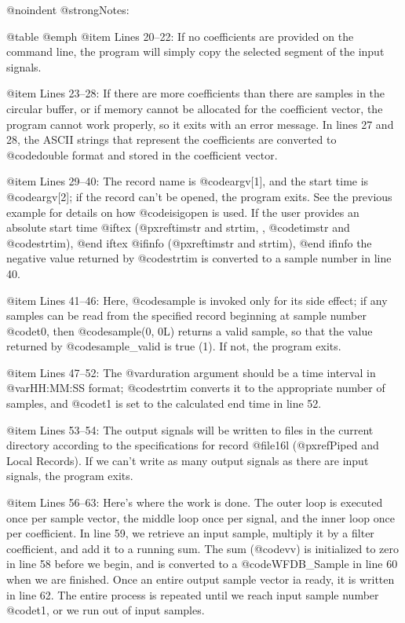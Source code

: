 {{{{{{{{{{@noindent
@strong{Notes:}

@table @emph
@item Lines 20--22:
If no coefficients are provided on the command line, the program will
simply copy the selected segment of the input signals.

@item Lines 23--28:
If there are more coefficients than there are samples in the circular
buffer, or if memory cannot be allocated for the coefficient vector, the
program cannot work properly, so it exits with an error message.  In
lines 27 and 28, the ASCII strings that represent the coefficients are
converted to @code{double} format and stored in the coefficient
vector.

@item Lines 29--40:
The record name is @code{argv[1]}, and the start time is @code{argv[2]};
if the record can't be opened, the program exits.  See the previous example
for details on how @code{isigopen} is used. If the user provides an absolute
start time
@iftex
(@pxref{timstr and strtim, , @code{timstr} and @code{strtim}}),
@end iftex
@ifinfo
(@pxref{timstr and strtim}),
@end ifinfo
the negative value returned by @code{strtim} is converted to a sample number
in line 40.

@item Lines 41--46:
Here, @code{sample} is invoked only for its side effect;  if any samples can
be read from the specified record beginning at sample number @code{t0}, then
@code{sample(0, 0L)} returns a valid sample, so that the value returned by
@code{sample_valid} is true (1).  If not, the program exits.

@item Lines 47--52:
The @var{duration} argument should be a time interval in @var{HH:MM:SS}
format; @code{strtim} converts it to the appropriate number of
samples, and @code{t1} is set to the calculated end time in line 52.

@item Lines 53--54:
The output signals will be written to files in the current directory
according to the specifications for record @file{16l}
(@pxref{Piped and Local Records}).  If we can't write as many output
signals as there are input signals, the program exits.

@item Lines 56--63:
Here's where the work is done.  The outer loop is executed once per
sample vector, the middle loop once per signal, and the inner loop
once per coefficient.  In line 59, we retrieve an input sample,
multiply it by a filter coefficient, and add it to a running sum.
The sum (@code{vv}) is initialized to zero in line 58 before we begin, and is
converted to a @code{WFDB_Sample} in line 60 when we are finished.  Once
an entire output sample vector ia ready, it is written in line 62.
The entire process is repeated until we reach input sample number @code{t1},
or we run out of input samples.

}}}}}}}}}}
